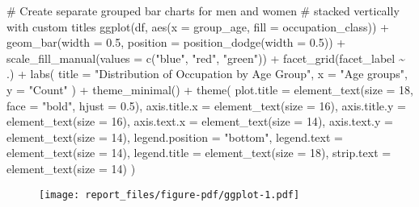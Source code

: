\documentclass[
  letterpaper,
  DIV=11,
  numbers=noendperiod]{scrartcl}
\newenvironment{Shaded}{\begin{snugshade}}{\end{snugshade}}
\newcommand{\AttributeTok}[1]{\textcolor[rgb]{0.40,0.45,0.13}{#1}}
\newcommand{\CommentTok}[1]{\textcolor[rgb]{0.37,0.37,0.37}{#1}}
\newcommand{\DecValTok}[1]{\textcolor[rgb]{0.68,0.00,0.00}{#1}}
\newcommand{\FloatTok}[1]{\textcolor[rgb]{0.68,0.00,0.00}{#1}}
\newcommand{\FunctionTok}[1]{\textcolor[rgb]{0.28,0.35,0.67}{#1}}
\newcommand{\NormalTok}[1]{\textcolor[rgb]{0.00,0.23,0.31}{#1}}
\newcommand{\SpecialCharTok}[1]{\textcolor[rgb]{0.37,0.37,0.37}{#1}}
\newcommand{\StringTok}[1]{\textcolor[rgb]{0.13,0.47,0.30}{#1}}
\begin{document}
\begin{Shaded}
\begin{Highlighting}[]
\CommentTok{\# Create separate grouped bar charts for men and women }
\CommentTok{\# stacked vertically with custom titles}
\FunctionTok{ggplot}\NormalTok{(df, }\FunctionTok{aes}\NormalTok{(}\AttributeTok{x =}\NormalTok{ group\_age, }\AttributeTok{fill =}\NormalTok{ occupation\_class)) }\SpecialCharTok{+}
  \FunctionTok{geom\_bar}\NormalTok{(}\AttributeTok{width =} \FloatTok{0.5}\NormalTok{, }\AttributeTok{position =} \FunctionTok{position\_dodge}\NormalTok{(}\AttributeTok{width =} \FloatTok{0.5}\NormalTok{)) }\SpecialCharTok{+}
  \FunctionTok{scale\_fill\_manual}\NormalTok{(}\AttributeTok{values =} \FunctionTok{c}\NormalTok{(}\StringTok{"blue"}\NormalTok{, }\StringTok{"red"}\NormalTok{, }\StringTok{"green"}\NormalTok{)) }\SpecialCharTok{+} 
  \FunctionTok{facet\_grid}\NormalTok{(facet\_label }\SpecialCharTok{\textasciitilde{}}\NormalTok{ .) }\SpecialCharTok{+}
  \FunctionTok{labs}\NormalTok{(}
    \AttributeTok{title =} \StringTok{"Distribution of Occupation by Age Group"}\NormalTok{,}
    \AttributeTok{x =} \StringTok{"Age groups"}\NormalTok{,}
    \AttributeTok{y =} \StringTok{"Count"}
\NormalTok{  ) }\SpecialCharTok{+}
  \FunctionTok{theme\_minimal}\NormalTok{() }\SpecialCharTok{+}
  \FunctionTok{theme}\NormalTok{(}
    \AttributeTok{plot.title =} \FunctionTok{element\_text}\NormalTok{(}\AttributeTok{size =} \DecValTok{18}\NormalTok{, }\AttributeTok{face =} \StringTok{"bold"}\NormalTok{, }\AttributeTok{hjust =} \FloatTok{0.5}\NormalTok{),}
    \AttributeTok{axis.title.x =} \FunctionTok{element\_text}\NormalTok{(}\AttributeTok{size =} \DecValTok{16}\NormalTok{),}
    \AttributeTok{axis.title.y =} \FunctionTok{element\_text}\NormalTok{(}\AttributeTok{size =} \DecValTok{16}\NormalTok{),}
    \AttributeTok{axis.text.x =} \FunctionTok{element\_text}\NormalTok{(}\AttributeTok{size =} \DecValTok{14}\NormalTok{),}
    \AttributeTok{axis.text.y =} \FunctionTok{element\_text}\NormalTok{(}\AttributeTok{size =} \DecValTok{14}\NormalTok{),}
    \AttributeTok{legend.position =} \StringTok{"bottom"}\NormalTok{,}
    \AttributeTok{legend.text =} \FunctionTok{element\_text}\NormalTok{(}\AttributeTok{size =} \DecValTok{14}\NormalTok{),}
    \AttributeTok{legend.title =} \FunctionTok{element\_text}\NormalTok{(}\AttributeTok{size =} \DecValTok{18}\NormalTok{),}
    \AttributeTok{strip.text =} \FunctionTok{element\_text}\NormalTok{(}\AttributeTok{size =} \DecValTok{14}\NormalTok{)}
\NormalTok{  )}
\end{Highlighting}
\end{Shaded}

\begin{figure}[H]

{\centering \texttt{[image: report\_files/figure-pdf/ggplot-1.pdf]}

}

\end{figure}
\end{document}
